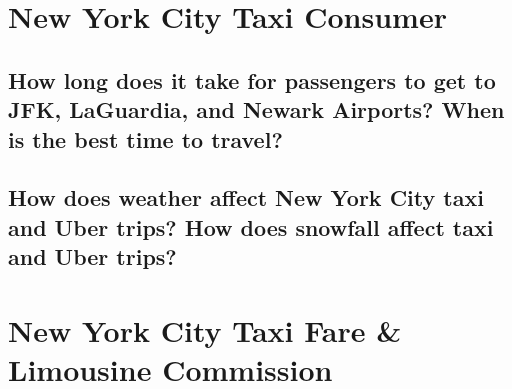 \documentclass[12pt,twoside]{reedthesis}
\newenvironment{Shaded}{\begin{snugshade}}{\end{snugshade}}
\newcommand{\KeywordTok}[1]{\textcolor[rgb]{0.13,0.29,0.53}{\textbf{#1}}}
\newcommand{\DecValTok}[1]{\textcolor[rgb]{0.00,0.00,0.81}{#1}}
\newcommand{\FloatTok}[1]{\textcolor[rgb]{0.00,0.00,0.81}{#1}}
\newcommand{\StringTok}[1]{\textcolor[rgb]{0.31,0.60,0.02}{#1}}
\newcommand{\OperatorTok}[1]{\textcolor[rgb]{0.81,0.36,0.00}{\textbf{#1}}}
\newcommand{\NormalTok}[1]{#1}
\theoremstyle{definition}
\theoremstyle{definition}
\theoremstyle{definition}
\theoremstyle{remark}
\begin{document}
\chapter{New York City Taxi Consumer}\label{chapter4}

\section{How long does it take for passengers to get to JFK, LaGuardia,
and Newark Airports? When is the best time to
travel?}\label{how-long-does-it-take-for-passengers-to-get-to-jfk-laguardia-and-newark-airports-when-is-the-best-time-to-travel}
\begin{Shaded}
\end{Shaded}
\begin{Shaded}
\end{Shaded}
\section{How does weather affect New York City taxi and Uber trips? How
does snowfall affect taxi and Uber
trips?}\label{how-does-weather-affect-new-york-city-taxi-and-uber-trips-how-does-snowfall-affect-taxi-and-uber-trips}

\chapter{New York City Taxi Fare \& Limousine
Commission}\label{chapter5}
\end{document}
